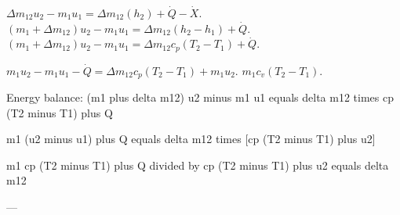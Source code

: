 \( \Delta m_{12} u_2 - m_1 u_1 = \Delta m_{12}(h_2) + \dot{Q} - \dot{X} \).  
\( (m_1 + \Delta m_{12}) u_2 - m_1 u_1 = \Delta m_{12}(h_2 - h_1) + \dot{Q} \).  
\( (m_1 + \Delta m_{12}) u_2 - m_1 u_1 = \Delta m_{12} c_p (T_2 - T_1) + \dot{Q} \).  

\( m_1 u_2 - m_1 u_1 - \dot{Q} = \Delta m_{12} c_p (T_2 - T_1) + m_1 u_2 \).  
\( m_1 c_v (T_2 - T_1) \).

Energy balance:  
(m1 plus delta m12) u2 minus m1 u1 equals delta m12 times cp (T2 minus T1) plus Q  

m1 (u2 minus u1) plus Q equals delta m12 times [cp (T2 minus T1) plus u2]  

m1 cp (T2 minus T1) plus Q divided by cp (T2 minus T1) plus u2 equals delta m12  

---